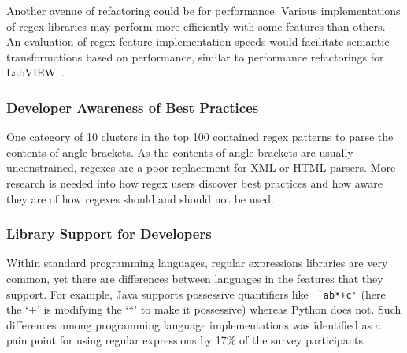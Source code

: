 Another avenue of refactoring could be for performance. Various implementations of regex libraries may perform more efficiently with some features than others. An evaluation of regex feature implementation speeds would facilitate semantic transformations based on performance, similar to performance refactorings for LabVIEW~\cite{chambers2013smell, chambers2015impact}.



\subsubsection{Developer Awareness of Best Practices}
One category of 10 clusters in the top 100 contained regex patterns to parse the contents of angle brackets.  As the contents of angle brackets are usually unconstrained, regexes are a poor replacement for XML or HTML parsers.  More research is needed into how regex users discover best practices and how aware they are of how regexes should and should not be used.

\subsubsection{Library Support for Developers}
Within standard programming languages, regular expressions libraries are very common, yet there are  differences between languages in the features that they support. For example, Java supports possessive quantifiers like \verb! `ab*+c'! (here the `+' is modifying the `*' to make it possessive) whereas Python does not. Such differences among programming language implementations was identified as a pain point for using regular expressions by 17\% of the survey participants. 


